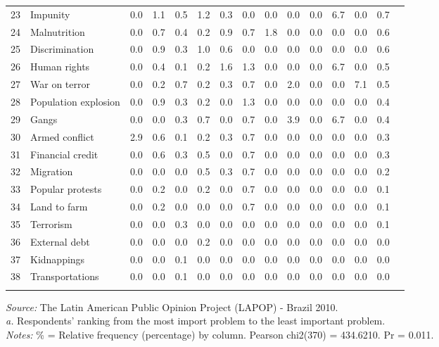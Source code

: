\documentclass[12pt,a4paper]{article}
\begin{document}
\begin{sidewaystable}
\begin{tabular}{cl *{13}{c} }
23	&	Impunity&0.0&1.1&0.5&1.2&0.3&0.0&0.0&0.0&0.0&6.7&0.0&0.7 \\
24	&	Malnutrition&0.0&0.7&0.4&0.2&0.9&0.7&1.8&0.0&0.0&0.0&0.0&0.6 \\
25	&	Discrimination&0.0&0.9&0.3&1.0&0.6&0.0&0.0&0.0&0.0&0.0&0.0&0.6 \\
26	&	Human rights&0.0&0.4&0.1&0.2&1.6&1.3&0.0&0.0&0.0&6.7&0.0&0.5 \\
27	&	War on terror&0.0&0.2&0.7&0.2&0.3&0.7&0.0&2.0&0.0&0.0&7.1&0.5 \\
28	&	Population explosion&0.0&0.9&0.3&0.2&0.0&1.3&0.0&0.0&0.0&0.0&0.0&0.4 \\
29	&	Gangs&0.0&0.0&0.3&0.7&0.0&0.7&0.0&3.9&0.0&6.7&0.0&0.4 \\
30	&	Armed conflict&2.9&0.6&0.1&0.2&0.3&0.7&0.0&0.0&0.0&0.0&0.0&0.3 \\
31	&	Financial credit&0.0&0.6&0.3&0.5&0.0&0.7&0.0&0.0&0.0&0.0&0.0&0.3 \\
32	&	Migration&0.0&0.0&0.0&0.5&0.3&0.7&0.0&0.0&0.0&0.0&0.0&0.2 \\
33	&	Popular protests&0.0&0.2&0.0&0.2&0.0&0.7&0.0&0.0&0.0&0.0&0.0&0.1 \\
34	&	Land to farm &0.0&0.2&0.0&0.0&0.0&0.7&0.0&0.0&0.0&0.0&0.0&0.1 \\
35	&	Terrorism&0.0&0.0&0.3&0.0&0.0&0.0&0.0&0.0&0.0&0.0&0.0&0.1 \\
36	&	External debt&0.0&0.0&0.0&0.2&0.0&0.0&0.0&0.0&0.0&0.0&0.0&0.0 \\
37	&	Kidnappings&0.0&0.0&0.1&0.0&0.0&0.0&0.0&0.0&0.0&0.0&0.0&0.0 \\
38	&	Transportations&0.0&0.0&0.1&0.0&0.0&0.0&0.0&0.0&0.0&0.0&0.0&0.0 \\
\bottomrule
\addlinespace[.75ex]
\end{tabular}
\par
\scriptsize{\emph{Source: }The Latin American Public Opinion Project (LAPOP) - Brazil 2010.}\\
\scriptsize{\emph{a.} Respondents' ranking from the most import problem to the least important problem.}\\
\scriptsize{\emph{Notes:} \% = Relative frequency (percentage) by column.}
\scriptsize{Pearson chi2(370) = 434.6210. Pr = 0.011.}
\end{sidewaystable}

\end{document}
